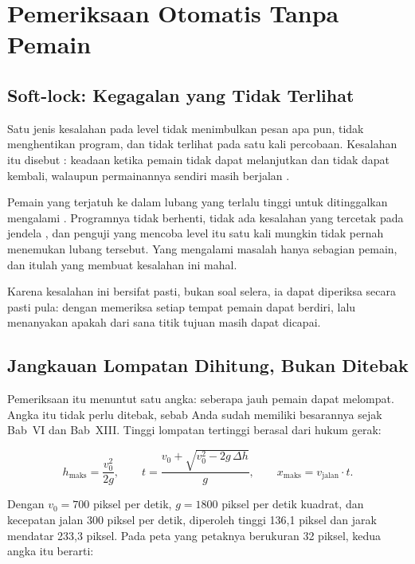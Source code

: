 \section{Pemeriksaan Otomatis Tanpa Pemain}
\label{sec:uji-otomatis}

\subsection{Soft-lock: Kegagalan yang Tidak Terlihat}

Satu jenis kesalahan pada level tidak menimbulkan pesan apa pun, tidak
menghentikan program, dan tidak terlihat pada satu kali percobaan. Kesalahan
itu disebut : keadaan ketika pemain tidak dapat melanjutkan
dan tidak dapat kembali, walaupun permainannya sendiri masih berjalan
\cite{unity-leveldesign}.

Pemain yang terjatuh ke dalam lubang yang terlalu tinggi untuk ditinggalkan
mengalami . Programnya tidak berhenti, tidak ada kesalahan
yang tercetak pada jendela , dan penguji yang mencoba level itu
satu kali mungkin tidak pernah menemukan lubang tersebut. Yang mengalami
masalah hanya sebagian pemain, dan itulah yang membuat kesalahan ini mahal.

Karena kesalahan ini bersifat pasti, bukan soal selera, ia dapat diperiksa
secara pasti pula: dengan memeriksa setiap tempat pemain dapat berdiri, lalu
menanyakan apakah dari sana titik tujuan masih dapat dicapai.

\subsection{Jangkauan Lompatan Dihitung, Bukan Ditebak}

Pemeriksaan itu menuntut satu angka: seberapa jauh pemain dapat melompat.
Angka itu tidak perlu ditebak, sebab Anda sudah memiliki besarannya sejak
Bab~VI dan Bab~XIII. Tinggi lompatan tertinggi berasal dari hukum gerak:

\[
h_{\text{maks}} = \frac{v_0^2}{2g},
\qquad
t = \frac{v_0 + \sqrt{v_0^2 - 2g\,\Delta h}}{g},
\qquad
x_{\text{maks}} = v_{\text{jalan}} \cdot t .
\]

Dengan $v_0 = 700$ piksel per detik, $g = 1800$ piksel per detik kuadrat, dan
kecepatan jalan 300 piksel per detik, diperoleh tinggi 136,1 piksel dan jarak
mendatar 233,3 piksel. Pada peta yang petaknya berukuran 32 piksel, kedua
angka itu berarti:

